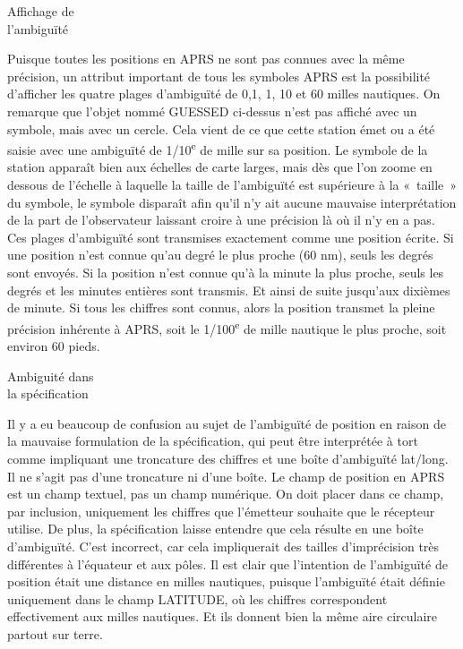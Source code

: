 \begin{aprssideblock}{Affichage de\\l'ambiguïté}
\label{affichage-de-lambiguuxe9}
Puisque toutes les positions en APRS ne sont pas connues avec la même
précision, un attribut important de tous les symboles APRS est la
possibilité d'afficher les quatre plages d'ambiguïté de 0,1, 1, 10 et
60 milles nautiques. On remarque que l'objet nommé GUESSED ci-dessus
n'est pas affiché avec un symbole, mais avec un cercle. Cela vient de ce
que cette station émet ou a été saisie avec une ambiguïté de
1/10\textsuperscript{e} de mille sur sa position. Le symbole de la
station apparaît bien aux échelles de carte larges, mais dès que l'on
zoome en dessous de l'échelle à laquelle la taille de l'ambiguïté est
supérieure à la «~taille~» du symbole, le symbole disparaît afin qu'il
n'y ait aucune mauvaise interprétation de la part de l'observateur
laissant croire à une précision là où il n'y en a pas. Ces plages
d'ambiguïté sont transmises exactement comme une position écrite. Si une
position n'est connue qu'au degré le plus proche (60 nm), seuls les
degrés sont envoyés. Si la position n'est connue qu'à la minute la plus
proche, seuls les degrés et les minutes entières sont transmis. Et ainsi
de suite jusqu'aux dixièmes de minute. Si tous les chiffres sont connus,
alors la position transmet la pleine précision inhérente à APRS, soit le
1/100\textsuperscript{e} de mille nautique le plus proche, soit environ
60 pieds.
\end{aprssideblock}

\begin{aprssideblock}{Ambiguité dans\\la spécification}
\label{ambiguituxe9-dans-la-spuxe9cification}
Il y a eu beaucoup de confusion au sujet de l'ambiguïté de position en
raison de la mauvaise formulation de la spécification, qui peut être
interprétée à tort comme impliquant une troncature des chiffres et une
boîte d'ambiguïté lat/long. Il ne s'agit pas d'une troncature ni d'une
boîte. Le champ de position en APRS est un champ textuel, pas un champ
numérique. On doit placer dans ce champ, par inclusion, uniquement les
chiffres que l'émetteur souhaite que le récepteur utilise. De plus, la
spécification laisse entendre que cela résulte en une boîte d'ambiguïté.
C'est incorrect, car cela impliquerait des tailles d'imprécision très
différentes à l'équateur et aux pôles. Il est clair que l'intention de
l'ambiguïté de position était une distance en milles nautiques, puisque
l'ambiguïté était définie uniquement dans le champ LATITUDE, où les
chiffres correspondent effectivement aux milles nautiques. Et ils
donnent bien la même aire circulaire partout sur terre.
\end{aprssideblock}

